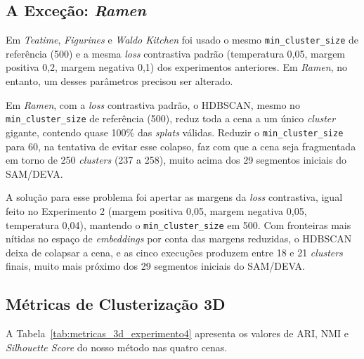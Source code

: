 \subsection{A Exceção: \textit{Ramen}}

Em \textit{Teatime}, \textit{Figurines} e \textit{Waldo Kitchen} foi usado o mesmo \texttt{min\_cluster\_size} de referência (500) e a mesma \textit{loss} contrastiva padrão (temperatura 0,05, margem positiva 0,2, margem negativa 0,1) dos experimentos anteriores. Em \textit{Ramen}, no entanto, um desses parâmetros precisou ser alterado.

Em \textit{Ramen}, com a \textit{loss} contrastiva padrão, o HDBSCAN, mesmo no \texttt{min\_cluster\_size} de referência (500), reduz toda a cena a um único \textit{cluster} gigante, contendo quase 100\% das \emph{splats} válidas. Reduzir o \texttt{min\_cluster\_size} para 60, na tentativa de evitar esse colapso, faz com que a cena seja fragmentada em torno de 250 \textit{clusters} (237 a 258), muito acima dos 29 segmentos iniciais do SAM/DEVA.


A solução para esse problema foi apertar as margens da \textit{loss} contrastiva, igual feito no Experimento 2 (margem positiva 0,05, margem negativa 0,05, temperatura 0,04), mantendo o \texttt{min\_cluster\_size} em 500. Com fronteiras mais nítidas no espaço de \textit{embeddings} por conta das margens reduzidas, o HDBSCAN deixa de colapsar a cena, e as cinco execuções produzem entre 18 e 21 \textit{clusters} finais, muito mais próximo dos 29 segmentos iniciais do SAM/DEVA.

\subsection{Métricas de Clusterização 3D}

A Tabela~\ref{tab:metricas_3d_experimento4} apresenta os valores de ARI, NMI e \textit{Silhouette Score} do nosso método nas quatro cenas.

\begin{table}[h]
\centering
\caption{Métricas de clusterização 3D do nosso método por cena (média de 5 execuções)}
\label{tab:metricas_3d_experimento4}
\end{table}


